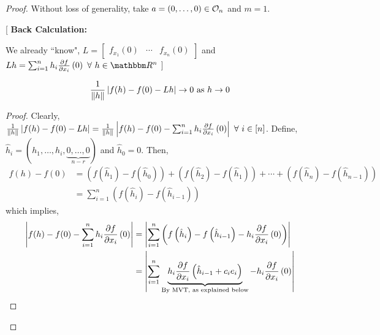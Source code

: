 \documentclass[Analysis-3]{subfiles}
\begin{document}
\begin{proof}
  Without loss of generality, take $ a = (0,\ldots,0) \in \mathcal{O}_{n} $ and $ m = 1 $.

    [
      \textbf{Back Calculation:}

      We already ``know", $ L = \begin{bmatrix}
          f_{x_1}(0) & \cdots & f_{x_n}(0)
        \end{bmatrix} $ and $ Lh = \sum_{i=1}^{n}h_i\pdv{f}{x_i}\left( 0 \right)\ \forall\ h \in \R^n $
    ]

  \begin{clmBox}
    \begin{align*}
      \frac{1}{\norm{h}}\left| f(h)-f(0)-Lh \right| \to 0 \text{ as } h \to 0
    \end{align*}
  \end{clmBox}

  \begin{proof}
    Clearly, $ \frac{1}{\norm{h}}\left| f(h)-f(0)-Lh \right| = \frac{1}{\norm{h}}\left| f(h)-f(0)-\sum_{i=1}^{n}h_i\pdv{f}{x_i}\left( 0 \right) \right|\ \forall\ i \in [n]$. Define, $ \hat{h}_i = (h_1, \ldots, h_i, \underbrace{0,\ldots,0}_{n-r}) $ and $ \hat{h}_0  = 0 $. Then,
    \begin{align*}
      f(h)-f(0) & = \left( f\left(\hat{h}_1\right) - f\left(\hat{h}_0\right) \right) + \left( f\left(\hat{h}_2\right) - f\left(\hat{h}_1\right) \right) + \cdots + \left( f\left(\hat{h}_{n}\right) - f\left(\hat{h}_{n-1}\right) \right) \\
                & =\sum_{i=1}^{n} \left( f\left(\hat{h}_{i}\right) - f\left(\hat{h}_{i-1}\right) \right)
    \end{align*}
    which implies, \begin{align*}
      \left| f(h)-f(0)-\sum_{i=1}^{n}h_i\pdv{f}{x_i}\left( 0 \right) \right| & = \left| \sum_{i=1}^{n} \left( f\left(\hat{h}_{i}\right) - f\left(\hat{h}_{i-1}\right) - h_i\pdv{f}{x_i}\left( 0 \right) \right) \right|                                \\
                                                                             & = \left| \sum_{i=1}^{n} \underbrace{h_i\pdv{f}{x_i}\left( \hat{h}_{i-1} + c_ie_i \right)}_{\text{By MVT, as explained below}} - h_i\pdv{f}{x_i}\left( 0 \right) \right|
    \end{align*}


\end{proof}
\end{proof}
\end{document}
